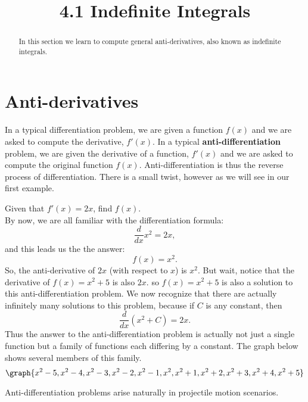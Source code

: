 \documentclass{ximera}
\title{4.1 Indefinite Integrals}
\begin{document}
\begin{abstract}
In this section we learn to compute general anti-derivatives, also known as indefinite integrals.
\end{abstract}

\maketitle

\section{Anti-derivatives}
In a typical differentiation problem, we are given a function $f(x)$ and
we are asked to compute the derivative, $f'(x)$.
In a typical \textbf{anti-differentiation} problem, we are given the derivative of a function, $f'(x)$
and we are asked to compute the original function $f(x)$.  Anti-differentiation is thus the reverse process of differentiation.
There is a small twist, however as we will see in our first example.

\begin{example}[example 1]
Given that $f'(x) = 2x$, find $f(x)$. \\
By now, we are all familiar with the differentiation formula:
\[
\frac{d}{dx} x^2 = 2x,
\]
and this leads us the the answer:
\[
f(x) = x^2.
\]
So, the anti-derivative of $2x$ (with respect to $x$) is $x^2$.
But wait, notice that the derivative of $f(x) = x^2 + 5$ is also $2x$.
so $f(x) = x^2 + 5$ is also a solution to this anti-differentiation problem.
We now recognize that there are actually infinitely many solutions to this problem, 
because if $C$ is any constant, then
\[
\frac{d}{dx} \left(x^2 + C\right) = 2x.
\]
Thus the answer to the anti-differentiation problem is actually not just a single function but a family of functions each differing by a constant.
The graph below shows several members of this family.
\[
\graph{x^2 - 5, x^2 - 4, x^2 - 3, x^2 - 2, x^2 - 1, x^2, x^2 +1, x^2 +2, x^2 +3, x^2 +4, x^2 +5}
\]

\end{example}

Anti-differentiation problems arise naturally in projectile motion scenarios.
\end{document}
